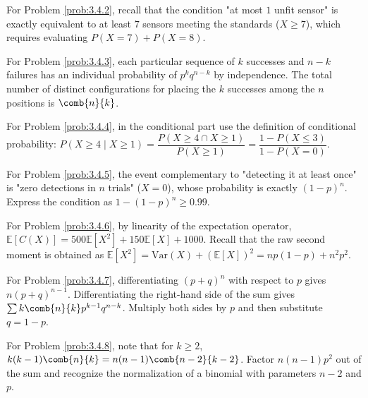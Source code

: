 \begin{sugerencia}
	\label{sug:3.4.2}
	For Problem \ref{prob:3.4.2}, recall that the condition "at most $1$ unfit sensor" is exactly equivalent to at least $7$ sensors meeting the standards ($X \ge 7$), which requires evaluating $P(X=7) + P(X=8)$.
\end{sugerencia}

\begin{sugerencia}
	\label{sug:3.4.3}
	For Problem \ref{prob:3.4.3}, each particular sequence of $k$ successes and $n-k$ failures has an individual probability of $p^k q^{n-k}$ by independence. The total number of distinct configurations for placing the $k$ successes among the $n$ positions is $\comb{n}{k}$.
\end{sugerencia}

\begin{sugerencia}
	\label{sug:3.4.4}
	For Problem \ref{prob:3.4.4}, in the conditional part use the definition of conditional probability: $P(X \ge 4 \mid X \ge 1) = \dfrac{P(X \ge 4 \cap X \ge 1)}{P(X \ge 1)} = \dfrac{1 - P(X \le 3)}{1 - P(X = 0)}$.
\end{sugerencia}

\begin{sugerencia}
	\label{sug:3.4.5}
	For Problem \ref{prob:3.4.5}, the event complementary to "detecting it at least once" is "zero detections in $n$ trials" ($X=0$), whose probability is exactly $(1-p)^n$. Express the condition as $1 - (1-p)^n \ge 0.99$.
\end{sugerencia}

\begin{sugerencia}
	\label{sug:3.4.6}
	For Problem \ref{prob:3.4.6}, by linearity of the expectation operator, $\mathbb{E}[C(X)] = 500 \mathbb{E}[X^2] + 150 \mathbb{E}[X] + 1000$. Recall that the raw second moment is obtained as $\mathbb{E}[X^2] = \text{Var}(X) + (\mathbb{E}[X])^2 = np(1-p) + n^2 p^2$.
\end{sugerencia}

\begin{sugerencia}
	\label{sug:3.4.7}
	For Problem \ref{prob:3.4.7}, differentiating $(p+q)^n$ with respect to $p$ gives $n(p+q)^{n-1}$. Differentiating the right-hand side of the sum gives $\sum k \comb{n}{k} p^{k-1} q^{n-k}$. Multiply both sides by $p$ and then substitute $q = 1-p$.
\end{sugerencia}

\begin{sugerencia}
	\label{sug:3.4.8}
	For Problem \ref{prob:3.4.8}, note that for $k \ge 2$, $k(k-1)\comb{n}{k} = n(n-1)\comb{n-2}{k-2}$. Factor $n(n-1)p^2$ out of the sum and recognize the normalization of a binomial with parameters $n-2$ and $p$.
\end{sugerencia}

